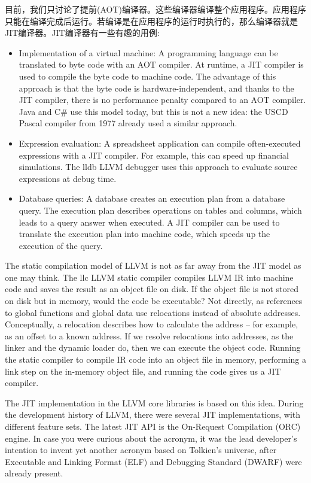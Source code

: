 
目前，我们只讨论了提前(AOT)编译器。这些编译器编译整个应用程序。应用程序只能在编译完成后运行。若编译是在应用程序的运行时执行的，那么编译器就是JIT编译器。JIT编译器有一些有趣的用例:

\begin{itemize}
\item
Implementation of a virtual machine: A programming language can be translated to byte code with an AOT compiler. At runtime, a JIT compiler is used to compile the byte code to machine code. The advantage of this approach is that the byte code is hardware-independent, and thanks to the JIT compiler, there is no performance penalty compared to an AOT compiler. Java and C\# use this model today, but this is not a new idea: the USCD Pascal compiler from 1977 already used a similar approach.

\item
Expression evaluation: A spreadsheet application can compile often-executed expressions with a JIT compiler. For example, this can speed up financial simulations. The lldb LLVM debugger uses this approach to evaluate source expressions at debug time.

\item
Database queries: A database creates an execution plan from a database query. The execution plan describes operations on tables and columns, which leads to a query answer when executed. A JIT compiler can be used to translate the execution plan into machine code, which speeds up the execution of the query.
\end{itemize}

The static compilation model of LLVM is not as far away from the JIT model as one may think. The llc LLVM static compiler compiles LLVM IR into machine code and saves the result as an object file on disk. If the object file is not stored on disk but in memory, would the code be executable? Not directly, as references to global functions and global data use relocations instead of absolute addresses. Conceptually, a relocation describes how to calculate the address – for example, as an offset to a known address. If we resolve relocations into addresses, as the linker and the dynamic loader do, then we can execute the object code. Running the static compiler to compile IR code into an object file in memory, performing a link step on the in-memory object file, and running the code gives us a JIT compiler.

The JIT implementation in the LLVM core libraries is based on this idea.
During the development history of LLVM, there were several JIT implementations, with different feature sets. The latest JIT API is the On-Request Compilation (ORC) engine. In case you were curious about the acronym, it was the lead developer’s intention to invent yet another acronym based on Tolkien’s universe, after Executable and Linking Format (ELF) and Debugging Standard (DWARF) were already present.

